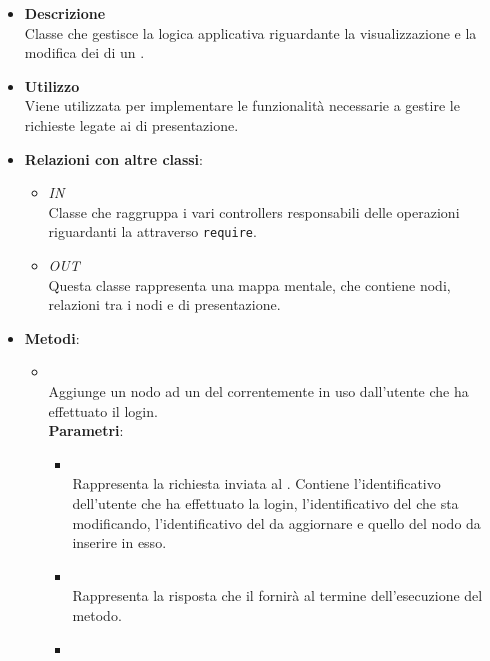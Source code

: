 \begin{itemize}
\item \textbf{Descrizione}\\
Classe che gestisce la logica applicativa riguardante la visualizzazione e la modifica dei  di un .
\item \textbf{Utilizzo}\\
Viene utilizzata per implementare le funzionalità necessarie a gestire le richieste  legate ai  di presentazione.
\item \textbf{Relazioni con altre classi}:
\begin{itemize}
\item \textit{IN} \hyperref[\nogloxy{Premi::Back-End::App::Controllers::ProjectController}]{}\\
Classe che raggruppa i vari controllers responsabili delle operazioni riguardanti la  attraverso \texttt{require}.
\item \textit{OUT} \hyperref[\nogloxy{Premi::Back-End::App::Models::ProjectModel}]{}\\
Questa classe rappresenta una mappa mentale, che contiene nodi, relazioni tra i nodi e  di presentazione.
\end{itemize}
\item \textbf{Metodi}:
\begin{itemize}
\item {}
\\ Aggiunge un nodo ad un  del  correntemente in uso dall’utente che ha effettuato il login.
\\ \textbf{Parametri}:
\begin{itemize}
\item {}
\\ Rappresenta la richiesta inviata al . Contiene l’identificativo dell’utente che ha effettuato la login, l’identificativo del  che sta modificando, l’identificativo del  da aggiornare e quello del nodo da inserire in esso.
\item {}
\\ Rappresenta la risposta che il  fornirà al termine dell’esecuzione del metodo.
\item {}

\end{itemize}
\end{itemize}
\end{itemize}
